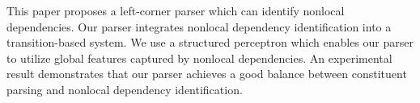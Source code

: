 This paper proposes a left-corner parser which can identify nonlocal dependencies. Our parser integrates nonlocal dependency identification into a transition-based system. We use a structured perceptron which enables our parser to utilize global features captured by nonlocal dependencies. An experimental result demonstrates that our parser achieves a good balance between constituent parsing and nonlocal dependency identification.
